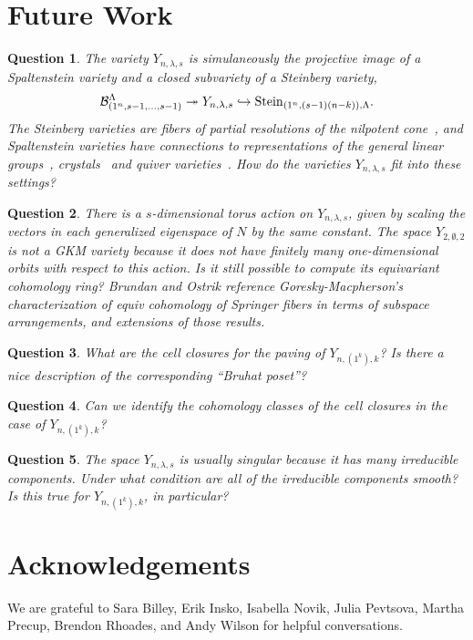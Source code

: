 \documentclass[12pt]{amsart}
\newcommand{\la}{\lambda}
\newtheorem{question}{Question}
\begin{document}
\section{Future Work}\label{sec:FutureWork}

\begin{question}
  The variety $Y_{n,\la,s}$ is simulaneously the projective image of a Spaltenstein variety and a closed subvariety of a Steinberg variety,
  \[
\cB_{(1^n,s-1,\dots,s-1)}^\Lambda \twoheadrightarrow Y_{n,\la,s}\hookrightarrow \mathrm{Stein}_{(1^n,(s-1)(n-k)),\Lambda}.
\]
The Steinberg varieties are fibers of partial resolutions of the nilpotent cone~\cite{Goresky-Macpherson}, and Spaltenstein varieties have connections to representations of the general linear groups~\cite{Braverman-Gaitsgory}, crystals~\cite{Malik} and quiver varieties~\cite{Nakajima1,Nakajima2}. How do the varieties $Y_{n,\la,s}$ fit into these settings?
\end{question}

\begin{question}
There is a $s$-dimensional torus action on $Y_{n,\la,s}$, given by scaling the vectors in each generalized eigenspace of $N$ by the same constant. The space $Y_{2,\emptyset,2}$ is not a GKM variety because it does not have finitely many one-dimensional orbits with respect to this action. Is it still possible to compute its equivariant cohomology ring? Brundan and Ostrik reference Goresky-Macpherson's characterization of equiv cohomology of Springer fibers in terms of subspace arrangements, and extensions of those results.
\end{question}

\begin{question}
What are the cell closures for the paving of $Y_{n,(1^k),k}$? Is there a nice description of the corresponding ``Bruhat poset''?
\end{question}

\begin{question}
Can we identify the cohomology classes of the cell closures in the case of $Y_{n,(1^k),k}$?
\end{question}

 
 
 \begin{question}
 The space $Y_{n,\la,s}$ is usually singular because it has many irreducible components. Under what condition are all of the irreducible components smooth? Is this true for $Y_{n,(1^k),k}$, in particular?
 \end{question}


\section{Acknowledgements}

We are grateful to Sara Billey, Erik Insko, Isabella Novik, Julia Pevtsova, Martha Precup, Brendon Rhoades, and Andy Wilson for helpful conversations.




\end{document}
